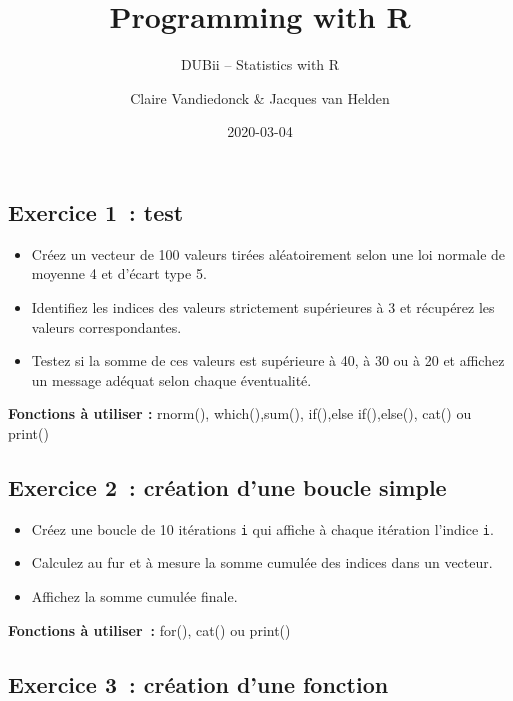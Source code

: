 \documentclass[
]{article}
\title{Programming with R}
\subtitle{DUBii -- Statistics with R}
\author{Claire Vandiedonck \& Jacques van Helden}
\date{2020-03-04}
\providecommand{\tightlist}{%
  \setlength{\itemsep}{0pt}\setlength{\parskip}{0pt}}
\begin{document}
\maketitle

{
\setcounter{tocdepth}{3}
\tableofcontents
}
\hypertarget{exercice-1-test}{%
\subsection{Exercice 1~: test}\label{exercice-1-test}}

\begin{itemize}
\item
  Créez un vecteur de 100 valeurs tirées aléatoirement selon une loi
  normale de moyenne 4 et d'écart type 5.
\item
  Identifiez les indices des valeurs strictement supérieures à 3 et
  récupérez les valeurs correspondantes.
\item
  Testez si la somme de ces valeurs est supérieure à 40, à 30 ou à 20 et
  affichez un message adéquat selon chaque éventualité.
\end{itemize}

\textbf{Fonctions à utiliser :} rnorm(), which(),sum(), if(),else
if(),else(), cat() ou print()

\hypertarget{exercice-2-cruxe9ation-dune-boucle-simple}{%
\subsection{Exercice 2~: création d'une boucle
simple}\label{exercice-2-cruxe9ation-dune-boucle-simple}}

\begin{itemize}
\tightlist
\item
  Créez une boucle de 10 itérations \texttt{i} qui affiche à chaque
  itération l'indice \texttt{i}.
\item
  Calculez au fur et à mesure la somme cumulée des indices dans un
  vecteur.
\item
  Affichez la somme cumulée finale.
\end{itemize}

\textbf{Fonctions à utiliser~:} for(), cat() ou print()

\hypertarget{exercice-3-cruxe9ation-dune-fonction}{%
\subsection{Exercice 3~: création d'une
fonction}\label{exercice-3-cruxe9ation-dune-fonction}}
\end{document}
